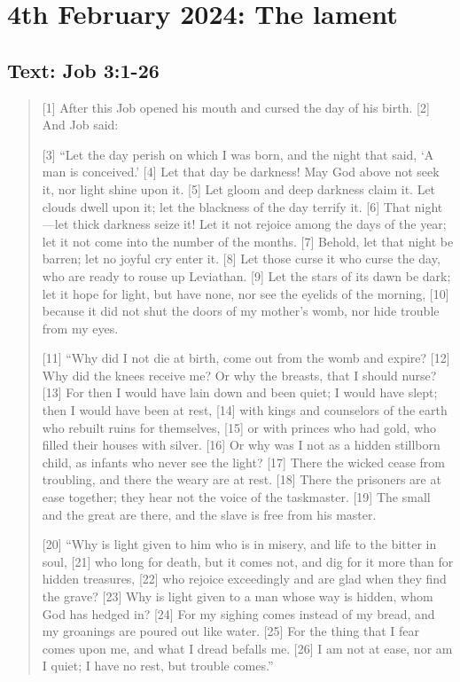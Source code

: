 \setcounter{figure}{0}

\section{4th February 2024: The lament}
\subsection*{Text: Job 3:1-26}
  \begin{quote}
    [1] After this Job opened his mouth and cursed the day of his birth. [2] And Job said:

    [3] “Let the day perish on which I was born,
        and the night that said,
        ‘A man is conceived.’
    [4] Let that day be darkness!
        May God above not seek it,
        nor light shine upon it.
    [5] Let gloom and deep darkness claim it.
        Let clouds dwell upon it;
        let the blackness of the day terrify it.
    [6] That night—let thick darkness seize it!
        Let it not rejoice among the days of the year;
        let it not come into the number of the months.
    [7] Behold, let that night be barren;
        let no joyful cry enter it.
    [8] Let those curse it who curse the day,
        who are ready to rouse up Leviathan.
    [9] Let the stars of its dawn be dark;
        let it hope for light, but have none,
        nor see the eyelids of the morning,
    [10] because it did not shut the doors of my mother’s womb,
        nor hide trouble from my eyes.


    [11] “Why did I not die at birth,
        come out from the womb and expire?
    [12] Why did the knees receive me?
        Or why the breasts, that I should nurse?
    [13] For then I would have lain down and been quiet;
        I would have slept; then I would have been at rest,
    [14] with kings and counselors of the earth
        who rebuilt ruins for themselves,
    [15] or with princes who had gold,
        who filled their houses with silver.
    [16] Or why was I not as a hidden stillborn child,
        as infants who never see the light?
    [17] There the wicked cease from troubling,
        and there the weary are at rest.
    [18] There the prisoners are at ease together;
        they hear not the voice of the taskmaster.
    [19] The small and the great are there,
        and the slave is free from his master.

    [20] “Why is light given to him who is in misery,
        and life to the bitter in soul,
    [21] who long for death, but it comes not,
        and dig for it more than for hidden treasures,
    [22] who rejoice exceedingly
        and are glad when they find the grave?
    [23] Why is light given to a man whose way is hidden,
        whom God has hedged in?
    [24] For my sighing comes instead of my bread,
        and my groanings are poured out like water.
    [25] For the thing that I fear comes upon me,
        and what I dread befalls me.
    [26] I am not at ease, nor am I quiet;
        I have no rest, but trouble comes.”
  \end{quote}
